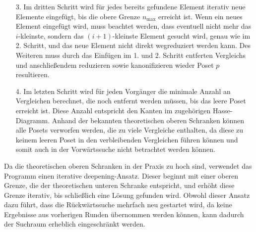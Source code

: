 \documentclass[10pt,journal,compsoc]{IEEEtran}
\newtheorem{lemma}{Lemma}
\begin{document}
\begin{itemize}
        \begin{lemma} \label{lemma:remove_only_last_element_edge}
          Um alle möglichen Vorgänger mit $n + 1$ Elementen zu konstruieren, müssen nur Vergleiche zwischen dem neuen Element und beliebig vielen anderen Elemente hinzugefügt werden.
        \end{lemma}

        \begin{proof} \label{proof:remove_only_last_element_edge}
          Angenommen, es existiert ein Vorgänger mit $n + 1$ Elementen, bei dem das $(n + 1)$-te Element wegreduziert werden kann, wenn ein Vergleich zwischen dem $i$-ten und dem $j$-ten Element eingefügt wird, wobei $0 \leq i < j \leq n$.
          Dann ... %
        \end{proof}

        Anschließend werden die Posets aus dem 1. und 2. Schritt in einer Menge zusammengeführt und es wird sichergestellt, dass alle Posets kanonisiert sind.
        Bezeichne den Vergleich, der eingefügt werden könnte, ohne das ein Element wegreduziert werden kann im folgenden als den entfernten Vergleich.

  \item[3.]
        Im dritten Schritt wird für jedes bereits gefundene Element iterativ neue Elemente eingefügt, bis die obere Grenze $n_{\text{max}}$ erreicht ist.
        Wenn ein neues Element eingefügt wird, muss beachtet werden, dass eventuell nicht mehr das $i$-kleinste, sondern das $(i + 1)$-kleinste Element gesucht wird, genau wie im 2. Schritt, und das neue Element nicht direkt wegreduziert werden kann.
        Des Weiteren muss durch das Einfügen im 1. und 2. Schritt entferten Vergleichs und anschließendem reduzieren sowie kanonifizieren wieder Poset $p$ resultieren.

  \item[4.]
        Im letzten Schritt wird für jeden Vorgänger die minimale Anzahl an Vergleichen berechnet, die noch entfernt werden müssen, bis das leere Poset erreicht ist.
        Diese Anzahl entspricht den Kanten im zugehörigen Hasse-Diagramm.
        Anhand der bekannten theoretischen oberen Schranken können alle Posets verworfen werden, die zu viele Vergleiche enthalten, da diese zu keinem leeren Poset in den verbleibenden Vergleichen führen können und somit auch in der Vorwärtssuche nicht betrachtet werden können.
\end{itemize}

Da die theoretischen oberen Schranken in der Praxis zu hoch sind, verwendet das Programm einen iterative deepening-Ansatz.
Dieser beginnt mit einer oberen Grenze, die der theoretischen unteren Schranke entspricht, und erhöht diese Grenze iterativ, bis schließlich eine Lösung gefunden wird.
Obwohl dieser Ansatz dazu führt, dass die Rückwärtssuche mehrfach neu gestartet wird, da keine Ergebnisse aus vorherigen Runden übernommen werden können, kann dadurch der Suchraum erheblich eingeschränkt werden.
\end{document}
